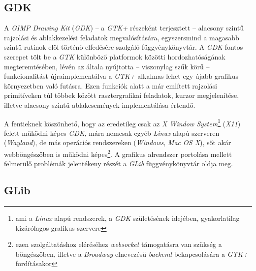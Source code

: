 \subsection{GDK}

A \textit{GIMP Drawing Kit} (\textit{GDK}) -- a \textit{GTK+} részeként terjesztett -- alacsony szintű rajzolási és ablakkezelési feladatok megvalósítására, egyszersmind a magasabb szintű rutinok elöl történő elfedésére szolgáló függvénykönyvtár. A \textit{GDK }fontos szerepet tölt be a \textit{GTK} különböző platformok közötti hordozhatóságának megteremtésében, lévén az általa nyújtotta -- viszonylag szűk körű -- funkcionalitást újraimplementálva a \textit{GTK+} alkalmas lehet egy újabb grafikus környezetben való futásra. Ezen funkciók alatt a már említett rajzolási primitíveken túl többek között rasztergrafikai feladatok, kurzor megjelenítése, illetve alacsony szintű ablakesemények implementálása értendő.

A fentieknek köszönhető, hogy az eredetileg csak az \textit{X Window System}\footnote{ami a \textit{Linux} alapú rendszerek, a \textit{GDK} születésének idejében, gyakorlatilag kizárólagos grafikus szervere} (\textit{X11}) felett működni képes \textit{GDK}, mára nemcsak egyéb \textit{Linux} alapú szerveren (\textit{Wayland}), de más operációs rendszereken (\textit{Windows}, \textit{Mac OS X}), sőt akár webböngészőben is működni képes\footnote{ezen szolgáltatáshoz eléréséhez \textit{websocket} támogatásra van szükség a böngészőben, illetve a \textit{Broadway} elnevezésű \textit{backend} bekapcsolására a \textit{GTK+} fordításakor}. A grafikus alrendszer portolása mellett felmerülő problémák jelentékeny részét a \textit{GLib} függvénykönyvtár oldja meg.

\subsection{GLib}

